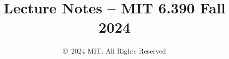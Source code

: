 \documentclass[10pt,oneside]{book}
\title{Lecture Notes -- MIT 6.390 Fall 2024}
\date{\copyright\ 2024 MIT. All Rights Reserved}
\begin{document}
\maketitle
\tableofcontents

\clearpage

















\begin{appendices}
    
    
    
    

    \printindex
    \clearpage
    \glsaddall
    \printglossaries
    \clearpage
\end{appendices}

%
%
%
%
%
\end{document}
